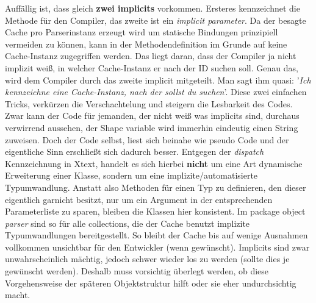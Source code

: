 Auffällig ist, dass gleich \textbf{zwei implicits} vorkommen. Ersteres kennzeichnet die Methode für den Compiler, das zweite ist ein \textit{implicit parameter}.
Da der besagte Cache pro Parserinstanz erzeugt wird um statische Bindungen prinzipiell vermeiden zu können, kann in der Methodendefinition im Grunde auf keine Cache-Instanz zugegriffen werden.
Das liegt daran, dass der Compiler ja nicht implizit weiß, in welcher Cache-Instanz er nach der ID suchen soll.
Genau das, wird dem Compiler durch das zweite implicit mitgeteilt. Man sagt ihm quasi: '\textit{Ich kennzeichne eine Cache-Instanz, nach der sollst du suchen}'.
Diese zwei einfachen Tricks, verkürzen die Verschachtelung und steigern die Lesbarkeit des Codes.
Zwar kann der Code für jemanden, der nicht weiß was implicits sind, durchaus verwirrend aussehen, der Shape variable wird immerhin eindeutig einen String zuweisen.
Doch der Code selbst, liest sich beinahe wie pseudo Code und der eigentliche Sinn erschließt sich dadurch besser.
Entgegen der \textit{dispatch} Kennzeichnung in Xtext, handelt es sich hierbei \textbf{nicht} um eine Art dynamische Erweiterung einer Klasse, sondern um eine implizite/automatisierte Typumwandlung.
Anstatt also Methoden für einen Typ zu definieren, den dieser eigentlich garnicht besitzt, nur um ein Argument in der entsprechenden Parameterliste zu sparen, bleiben die Klassen hier konsistent.
Im package object \textit{parser} sind so für alle collections, die der Cache benutzt implizite Typumwandlungen bereitgestellt.
So bleibt der Cache bis auf wenige Ausnahmen vollkommen unsichtbar für den Entwickler (wenn gewünscht).
Implicits sind zwar unwahrscheinlich mächtig, jedoch schwer wieder los zu werden (sollte dies je gewünscht werden).
Deshalb muss vorsichtig überlegt werden, ob diese Vorgehensweise der späteren Objektstruktur hilft oder sie eher undurchsichtig macht.
